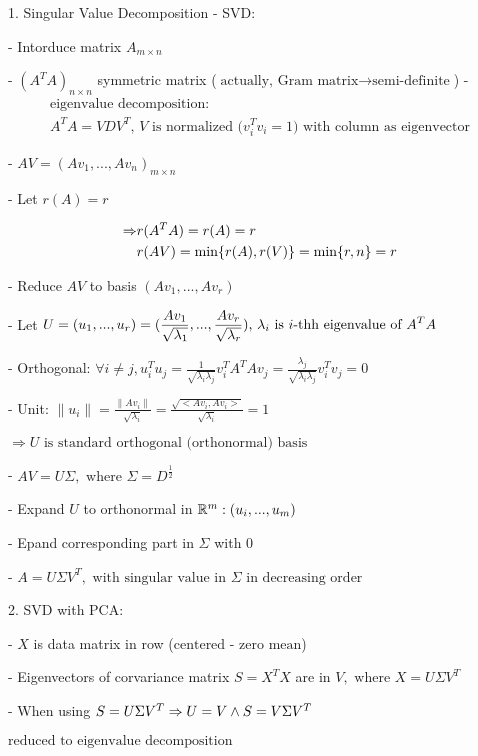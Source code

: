 1. Singular Value Decomposition - SVD:

- Intorduce matrix $A_{m\times n}$ 

- $(A^TA)_{n\times n}$ symmetric matrix ($\text{actually, Gram matrix} \rightarrow \text{semi-definite}$) 
- \begin{gather} \text{eigenvalue decomposition: } \\ A^TA=VDV^T\text{, $V$ is normalized ($v_i^Tv_i=1$) with column as eigenvector} \end{gather}

- $AV=(Av_1,...,Av_n)_{m\times n}$ 

- Let $r(A)=r$

\begin{align} \Rightarrow & r(A^TA)=r(A)=r \space \\&  r(AV)=\min\{r(A),r(V)\}=\min\{r,n\}=r\end{align}

- Reduce $AV$ to basis $(Av_1,...,Av_r)$  

- Let \(\displaystyle U=(u_1,...,u_r) = (\frac {Av_1} {\sqrt {\lambda_1}},...,\frac{Av_r}{\sqrt{\lambda_r}}) \space \text{, $\lambda_i$ is $i$-thh eigenvalue of $A^TA$}\) 

- Orthogonal: $\forall i\neq j, u_i^Tu_j=\frac 1 {\sqrt{\lambda_i\lambda_j}}v_i^TA^TAv_j=\frac {\lambda_j} {\sqrt{\lambda_i\lambda_j}}v_i^Tv_j=0$ 

- Unit: $\|u_i\|=\frac {\|Av_i\|} {\sqrt{\lambda_i}}=\frac {\sqrt {<Av_i,Av_i>}} {\sqrt{\lambda_i}}=1$ 

$\boldsymbol \Rightarrow U \text{ is standard orthogonal (orthonormal) basis}$ 

- $AV=U\Sigma,\text{ where } \Sigma = D^{\frac 1 2}$ 

- Expand $U$ to orthonormal in $\mathbb R^m: \space (u_i,...,u_m)$ 

- Epand corresponding part in $\Sigma$ with $0$ 

- \(A = U\Sigma V^T,\text{ with singular value in $\Sigma$ in decreasing order}\)

2. SVD with PCA:

- $X$ is data matrix in row ($\text{centered - zero mean}$)

- Eigenvectors of corvariance matrix $S=X^TX$ are in $V, \text{ where }X = U\Sigma V^T$ 

- When using $S=U\Sigma V^T \Rightarrow \space U=V \space \land \space S=V\Sigma V^T$ 

	$\text{reduced to eigenvalue decomposition}$ 

